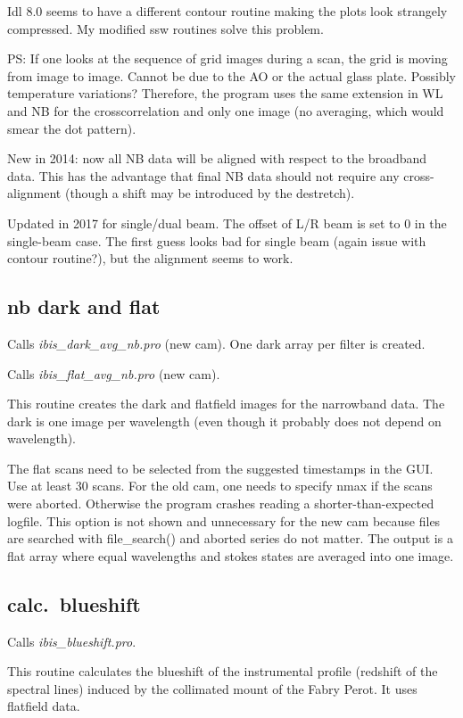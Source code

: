 \documentclass[a4paper,12pt]{article}
\begin{document}
Idl 8.0 seems to have a different
contour routine making the plots look strangely compressed. My modified ssw routines
solve this problem.



PS: If one looks at the sequence of grid images during a scan, the grid is moving from image to image. Cannot be due to the AO or the actual glass plate. Possibly temperature variations? Therefore, the program uses the same extension in WL and NB for the crosscorrelation and only one image (no averaging, which would smear the dot pattern).

New in 2014: now all NB data will be aligned with respect to the broadband data. This has the advantage that final NB data should not require any cross-alignment (though a shift may be introduced by the destretch).

Updated in 2017 for single/dual beam. The offset of L/R beam is set to 0 in the single-beam case. The first guess looks bad for single beam (again issue with contour routine?), but the alignment seems to work.

\subsection{nb dark and flat}
Calls \textit{ibis\_dark\_avg\_nb.pro} (new cam). One dark array per filter is created.

Calls \textit{ibis\_flat\_avg\_nb.pro} (new cam).

This routine creates the dark and flatfield images for the narrowband data. The dark is one image per wavelength (even though it probably does not depend on wavelength). 

The flat scans need to be selected from the suggested timestamps in the GUI. Use at least 30 scans. For the old cam, one needs to specify nmax if the scans were aborted. Otherwise the program crashes reading a shorter-than-expected logfile. This option is not shown and unnecessary for the new cam because files are searched with file\_search() and aborted series do not matter. The output is a flat array where equal wavelengths and stokes states are averaged into one image.

\subsection{calc.~blueshift}
Calls \textit{ibis\_blueshift.pro}.

This routine calculates the blueshift of the instrumental profile (redshift of the spectral lines) induced by the collimated mount of the Fabry Perot. It uses flatfield data.
\end{document}

